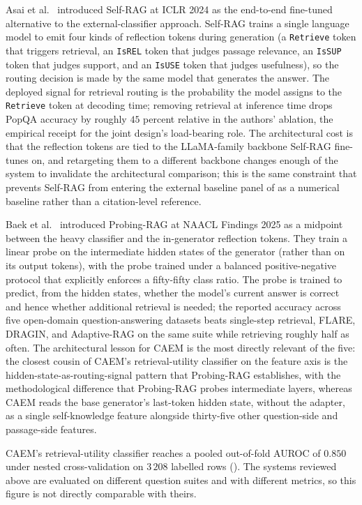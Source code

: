Asai et al.~\cite{asai2024selfrag} introduced Self-RAG at ICLR 2024 as the end-to-end fine-tuned alternative to the external-classifier approach. Self-RAG trains a single language model to emit four kinds of reflection tokens during generation (a \texttt{Retrieve} token that triggers retrieval, an \texttt{IsREL} token that judges passage relevance, an \texttt{IsSUP} token that judges support, and an \texttt{IsUSE} token that judges usefulness), so the routing decision is made by the same model that generates the answer. The deployed signal for retrieval routing is the probability the model assigns to the \texttt{Retrieve} token at decoding time; removing retrieval at inference time drops PopQA accuracy by roughly $45$ percent relative in the authors' ablation, the empirical receipt for the joint design's load-bearing role. The architectural cost is that the reflection tokens are tied to the LLaMA-family backbone Self-RAG fine-tunes on, and retargeting them to a different backbone changes enough of the system to invalidate the architectural comparison; this is the same constraint that prevents Self-RAG from entering the external baseline panel of  as a numerical baseline rather than a citation-level reference.

Baek et al.~\cite{baek2025probing} introduced Probing-RAG at NAACL Findings 2025 as a midpoint between the heavy classifier and the in-generator reflection tokens. They train a linear probe on the intermediate hidden states of the generator (rather than on its output tokens), with the probe trained under a balanced positive-negative protocol that explicitly enforces a fifty-fifty class ratio. The probe is trained to predict, from the hidden states, whether the model's current answer is correct and hence whether additional retrieval is needed; the reported accuracy across five open-domain question-answering datasets beats single-step retrieval, FLARE, DRAGIN, and Adaptive-RAG on the same suite while retrieving roughly half as often. The architectural lesson for CAEM is the most directly relevant of the five: the closest cousin of CAEM's retrieval-utility classifier on the feature axis is the hidden-state-as-routing-signal pattern that Probing-RAG establishes, with the methodological difference that Probing-RAG probes intermediate layers, whereas CAEM reads the base generator's last-token hidden state, without the adapter, as a single self-knowledge feature alongside thirty-five other question-side and passage-side features.

CAEM's retrieval-utility classifier reaches a pooled out-of-fold AUROC of $0.850$ under nested cross-validation on $3\,208$ labelled rows (). The systems reviewed above are evaluated on different question suites and with different metrics, so this figure is not directly comparable with theirs.

